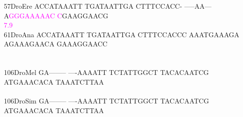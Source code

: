 \documentclass[11pt,twoside,reqno,a4paper]{article}
\begin{document}
{57\hspace*{2\charwidth}DroEre	ACCATAAATT	TGATAATTGA	CTTTCCACC-	-----AA---	A\textcolor{magenta}{G}\textcolor{magenta}{G}\textcolor{magenta}{G}\textcolor{magenta}{A}\textcolor{magenta}{A}\textcolor{magenta}{A}\textcolor{magenta}{A}\textcolor{magenta}{A}\textcolor{magenta}{C}	\textcolor{magenta}{C}GAAGGAACG	\\
\hspace*{4\charwidth}\hspace*{7\charwidth}\hspace*{1\charwidth}\hspace*{1\charwidth}\hspace*{1\charwidth}\hspace*{1\charwidth}\hspace*{41\charwidth}\textcolor{magenta}{7.9}\hspace*{1\charwidth}\hspace*{1\charwidth}\\
61\hspace*{2\charwidth}DroAna	ACCATAAATT	TGATAATTGA	CTTTCCACCC	AAATGAAAGA	AGAAAGAACA	GAAAGGAACC	\\
\hspace*{4\charwidth}\hspace*{7\charwidth}\hspace*{1\charwidth}\hspace*{1\charwidth}\hspace*{1\charwidth}\hspace*{1\charwidth}\hspace*{1\charwidth}\hspace*{1\charwidth}\\
\\
106\hspace*{1\charwidth}DroMel	GA--------	----AAAATT	TCTATTGGCT	TACACAATCG	ATGAAACACA	TAAATCTTAA	\\
\hspace*{4\charwidth}\hspace*{7\charwidth}\hspace*{1\charwidth}\hspace*{1\charwidth}\hspace*{1\charwidth}\hspace*{1\charwidth}\hspace*{1\charwidth}\hspace*{1\charwidth}\\
106\hspace*{1\charwidth}DroSim	GA--------	----AAAATT	TCTATTGGCT	TACACAATCG	ATGAAACACA	TAAATCTTAA	\\
}
\end{document}
